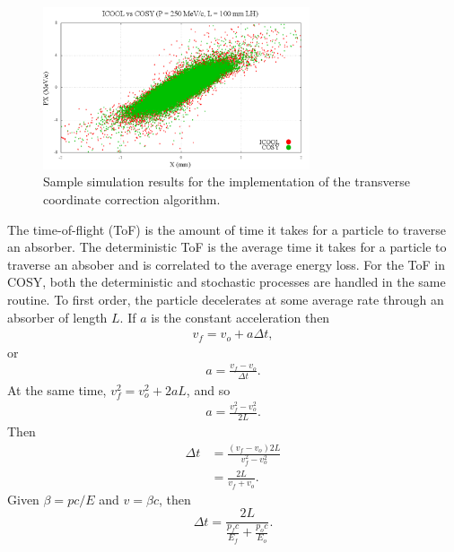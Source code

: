 \begin{figure}[H]
  \centering
    \includegraphics[width=0.7\textwidth]{Figures/xpx_phase_space_implemented} 
  \caption{Sample simulation results for the implementation of the transverse coordinate correction algorithm.}
  \label{fig:xpx_phase_space_implemented}
\end{figure}
%
%
\label{sec:COSYTemporalDisplacement}\par
The time-of-flight (ToF) is the amount of time it takes for a particle to traverse an absorber. The deterministic ToF is the average time it takes for a particle to traverse an absober and is correlated to the average energy loss. For the ToF in COSY, both the deterministic and stochastic processes are handled in the same routine. To first order, the particle decelerates at some  average rate through an absorber of length $L$. If $a$ is the constant acceleration then 
\begin{align*}
v_f=v_o+a\Delta t,
\end{align*}
or 
\begin{align*}
a=\frac{v_f-v_o}{\Delta t}.
\end{align*}
At the same time, $v_f ^2 = v_o ^2 + 2 a L$, and so
\begin{align*}
 a=\frac{v_f ^2 - v_o ^2}{2L}.
\end{align*}
Then
\begin{align*}
\Delta t &= \frac{(v_f-v_o)2L}{v_f^2-v_o^2}\\
&= \frac{2L}{v_f+v_o}.
\end{align*}
Given $\beta=pc/E$ and $v=\beta c$, then
\begin{equation}\label{eqn:cosyDeltaT}
\Delta t=\frac{2L}{\frac{p_f c}{E_f}+\frac{p_o c}{E_o}}.
\end{equation}

